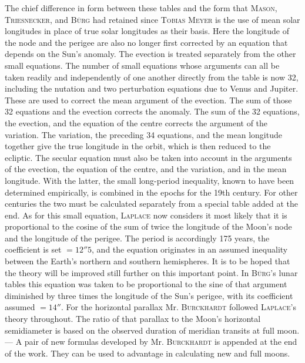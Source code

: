 The chief difference in form between these tables and the form that \textsc{Mason}, \textsc{Triesnecker}, and \textsc{Bürg} had retained since \textsc{Tobias Meyer} is the use of mean solar longitudes in place of true solar longitudes as their basis. Here the longitude of the node and the perigee are also no longer first corrected by an equation that depends on the Sun's anomaly. The evection is treated separately from the other small equations. The number of small equations whose arguments can all be taken readily and independently of one another directly from the table is now 32, including the nutation and two perturbation equations due to Venus and Jupiter. These are used to correct the mean argument of the evection. The sum of those 32 equations and the evection corrects the anomaly. The sum of the 32 equations, the evection, and the equation of the centre corrects the argument of the variation. The variation, the preceding 34 equations, and the mean longitude together give the true longitude in the orbit, which is then reduced to the ecliptic. The secular equation must also be taken into account in the arguments of the evection, the equation of the centre, and the variation, and in the mean longitude. With the latter, the small long-period inequality, known to have been determined empirically, is combined in the epochs for the 19th century. For other centuries the two must be calculated separately from a special table added at the end. As for this small equation, \textsc{Laplace} now considers it most likely that it is proportional to the cosine of the sum of twice the longitude of the Moon's node and the longitude of the perigee. The period is accordingly 175 years, the coefficient is set $= 12''5$, and the equation originates in an assumed inequality between the Earth's northern and southern hemispheres. It is to be hoped that the theory will be improved still further on this important point. In \textsc{Bürg}'s lunar tables this equation was taken to be proportional to the sine of that argument diminished by three times the longitude of the Sun's perigee, with its coefficient assumed $= 14''$. For the horizontal parallax Mr. \textsc{Burckhardt} followed \textsc{Laplace}'s theory throughout. The ratio of that parallax to the Moon's horizontal semidiameter is based on the observed duration of meridian transits at full moon. --- A pair of new formulas developed by Mr. \textsc{Burckhardt} is appended at the end of the work. They can be used to advantage in calculating new and full moons.
